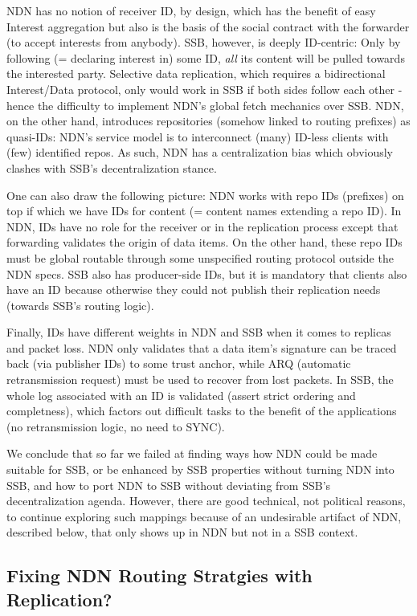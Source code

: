 \documentclass[10pt,sigconf]{acmart}
\begin{document}
NDN has no notion of receiver ID, by design, which has the benefit of
easy Interest aggregation but also is the basis of the social contract
with the forwarder (to accept interests from anybody). SSB, however,
is deeply ID-centric: Only by following (= declaring interest in) some
ID, {\em all} its content will be pulled towards the interested
party. Selective data replication, which requires a bidirectional
Interest/Data protocol, only would work in SSB if both sides follow
each other - hence the difficulty to implement NDN's global fetch
mechanics over SSB. NDN, on the other hand, introduces repositories
(somehow linked to routing prefixes) as quasi-IDs: NDN's service model
is to interconnect (many) ID-less clients with (few) identified repos.
As such, NDN has a centralization bias which obviously clashes with
SSB's decentralization stance.

One can also draw the following picture: NDN works with repo IDs
(prefixes) on top if which we have IDs for content (= content names
extending a repo ID). In NDN, IDs have no role for the receiver or in
the replication process except that forwarding validates the origin of
data items. On the other hand, these repo IDs must be global routable
through some unspecified routing protocol outside the NDN specs. SSB
also has producer-side IDs, but it is mandatory that clients also have
an ID because otherwise they could not publish their replication needs
(towards SSB's routing logic).

Finally, IDs have different weights in NDN and SSB when it comes to
replicas and packet loss. NDN only validates that a data item's
signature can be traced back (via publisher IDs) to some trust anchor,
while ARQ (automatic retransmission request) must be used to recover
from lost packets. In SSB, the whole log associated with an ID is
validated (assert strict ordering and completness), which factors out
difficult tasks to the benefit of the applications (no retransmission
logic, no need to SYNC).

We conclude that so far we failed at finding ways how NDN could be
made suitable for SSB, or be enhanced by SSB properties without
turning NDN into SSB, and how to port NDN to SSB without deviating
from SSB's decentralization agenda. However, there are good technical,
not political reasons, to continue exploring such mappings because of
an undesirable artifact of NDN, described below, that only shows up
in NDN but not in a SSB context.


\subsection{Fixing NDN Routing Stratgies with Replication?}
\end{document}
